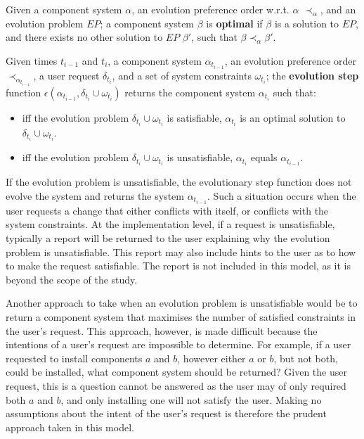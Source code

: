 \begin{defs}
Given a component system $\alpha$, an evolution preference order w.r.t. $\alpha$ $\prec_{\alpha}$, and an evolution problem $EP$;
a component system $\beta$ is \textbf{optimal} if $\beta$ is a solution to $EP$, and there exists no other solution to $EP$ $\beta'$, such that $\beta \prec_{\alpha} \beta'$.   
\end{defs}

\begin{defs}
\label{formal.stepdef}
Given times $t_{i-1}$ and $t_i$, a component system $\alpha_{t_{i-1}}$, an evolution preference order $\prec_{\alpha_{t_{i-1}}}$, 
a user request $\delta_{t_i}$, and a set of system constraints $\omega_{t_i}$;
the \textbf{evolution step} function  $\epsilon(\alpha_{t_{i-1}},\delta_{t_i} \cup \omega_{t_i})$ returns the component system $\alpha_{t_i}$ such that:
\begin{itemize}
  \item iff the evolution problem $\delta_{t_i} \cup \omega_{t_i}$ is satisfiable, $\alpha_{t_i}$ is an optimal solution to $\delta_{t_i} \cup \omega_{t_i}$.
  \item iff the evolution problem $\delta_{t_i} \cup \omega_{t_i}$ is unsatisfiable, $\alpha_{t_i}$ equals $\alpha_{t_{i-1}}$.
\end{itemize}
\end{defs}
If the evolution problem is unsatisfiable, the evolutionary step function does not evolve the system and returns the system $\alpha_{t_{i-1}}$.
Such a situation occurs when the user requests a change that either conflicts with itself, or conflicts with the system constraints.
At the implementation level, if a request is unsatisfiable, typically a report will be returned to the user explaining why the evolution problem is unsatisfiable.
This report may also include hints to the user as to how to make the request satisfiable.
The report is not included in this model, as it is beyond the scope of the study.

Another approach to take when an evolution problem is unsatisfiable would be to return a component system that maximises the number of satisfied constraints in the user's request.
This approach, however, is made difficult because the intentions of a user's request are impossible to determine.
For example, if a user requested to install components $a$ and $b$, however either $a$ or $b$, but not both, could be installed, what component system should be returned?
Given the user request, this is a question cannot be answered as the user may of only required both $a$ and $b$, and only installing one will not satisfy the user.
Making no assumptions about the intent of the user's request is therefore the prudent approach taken in this model.

